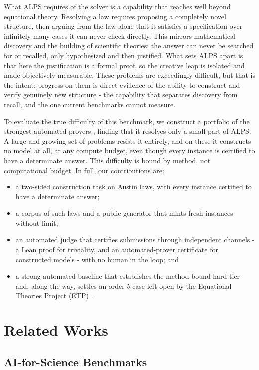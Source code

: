 \documentclass[letterpaper]{article} %
\begin{document}
What ALPS requires of the solver is a capability that reaches well beyond equational theory. Resolving a law requires proposing a completely novel structure, then arguing from the law alone that it satisfies a specification over infinitely many cases it can never check directly. This mirrors mathematical discovery and the building of scientific theories: the answer can never be searched for or recalled, only hypothesized and then justified. What sets ALPS apart is that here the justification is a formal proof, so the creative leap is isolated and made objectively measurable. These problems are exceedingly difficult, but that is the intent: progress on them is direct evidence of the ability to construct and verify genuinely new structure - the capability that separates discovery from recall, and the one current benchmarks cannot measure.


To evaluate the true difficulty of this benchmark, we construct a portfolio of the strongest automated provers \citep{kovacs2013first, schulz2019faster, smallbone2021twee}, finding that it resolves only a small part of ALPS. A large and growing set of problems resists it entirely, and on these it constructs no model at all, at any compute budget, even though every instance is certified to have a determinate answer. This difficulty is bound by method, not computational budget. In full, our contributions are:
\begin{itemize}
\item a two-sided construction task on Austin laws, with every instance certified to have a determinate answer;
\item a corpus of such laws and a public generator that mints fresh instances without limit;
\item an automated judge that certifies submissions through independent channels - a Lean proof\citep{moura2021lean} for triviality, and an automated-prover certificate \citep{kovacs2013first} for constructed models - with no human in the loop; and
\item a strong automated baseline that establishes the method-bound hard tier and, along the way, settles an order-5 case left open by the Equational Theories Project (ETP) \citep{bolan2025equational}.
\end{itemize}


\section{Related Works}

\subsection{AI-for-Science Benchmarks}
\end{document}
